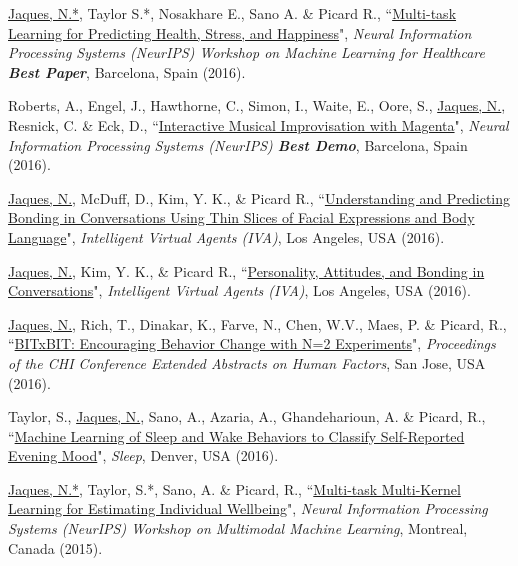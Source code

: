 \documentclass[paper=letter,fontsize=11pt]{scrartcl} %
\newcommand{\PaperEntry}[6]{
		\noindent #1, ``\href{#6}{#2}", \textit{#3}, #4 (#5).}
\begin{document}
\begin{etaremune}
\item \PaperEntry{\underline{Jaques, N.*}, Taylor S.*, Nosakhare E., Sano A. \& Picard R.}{Multi-task Learning for Predicting Health, Stress, and Happiness}{Neural Information Processing Systems (NeurIPS) Workshop on Machine Learning for Healthcare \textbf{Best Paper}}{Barcelona, Spain}{2016}{https://pdfs.semanticscholar.org/b228/7a406985980515d5cc63e9b37fb17c5186f8.pdf}

\item \PaperEntry{Roberts, A., Engel, J., Hawthorne, C., Simon, I., Waite, E., Oore, S., \underline{Jaques, N.}, Resnick, C. \& Eck, D.}{Interactive Musical Improvisation with Magenta}{Neural Information Processing Systems (NeurIPS) \textbf{Best Demo}}{Barcelona, Spain}{2016}{https://nips.cc/Conferences/2016/Schedule?showEvent=6307}

\item \PaperEntry{\underline{Jaques, N.}, McDuff, D., Kim, Y. K., \& Picard R.}{Understanding and Predicting Bonding in Conversations Using Thin Slices of Facial Expressions and Body Language}{Intelligent Virtual Agents (IVA)}{Los Angeles, USA}{2016}{https://dspace.mit.edu/handle/1721.1/138086.2}

\item \PaperEntry{\underline{Jaques, N.}, Kim, Y. K., \& Picard R.}{Personality, Attitudes, and Bonding in Conversations}{Intelligent Virtual Agents (IVA)}{Los Angeles, USA}{2016}{https://www.media.mit.edu/publications/personality-attitudes-and-bonding-in-conversations/}

\item \PaperEntry{\underline{Jaques, N.}, Rich, T., Dinakar, K., Farve, N., Chen, W.V., Maes, P. \& Picard, R.}{BITxBIT: Encouraging Behavior Change with N=2 Experiments}{Proceedings of the CHI Conference Extended Abstracts on Human Factors}{San Jose, USA}{2016}{https://dspace.mit.edu/bitstream/handle/1721.1/137083/16.Jaques-etal-CHI.pdf?sequence=2&isAllowed=y}

\item \PaperEntry{Taylor, S., \underline{Jaques, N.}, Sano, A., Azaria, A., Ghandeharioun, A. \& Picard, R.}{Machine Learning of Sleep and Wake Behaviors to Classify Self-Reported Evening Mood}{Sleep}{Denver, USA}{2016}{https://www.media.mit.edu/publications/machine-learning-of-sleep-and-wake-behaviors-to-classify-self-reported-evening-mood/}

\item \PaperEntry{\underline{Jaques, N.*}, Taylor, S.*, Sano, A. \& Picard, R.}{Multi-task Multi-Kernel Learning for Estimating Individual Wellbeing}{Neural Information Processing Systems (NeurIPS) Workshop on Multimodal Machine Learning}{Montreal, Canada}{2015}{https://www.media.mit.edu/publications/multi-task-multi-kernel-learning-for-estimating-individual-wellbeing/}


\end{etaremune}
\end{document}

